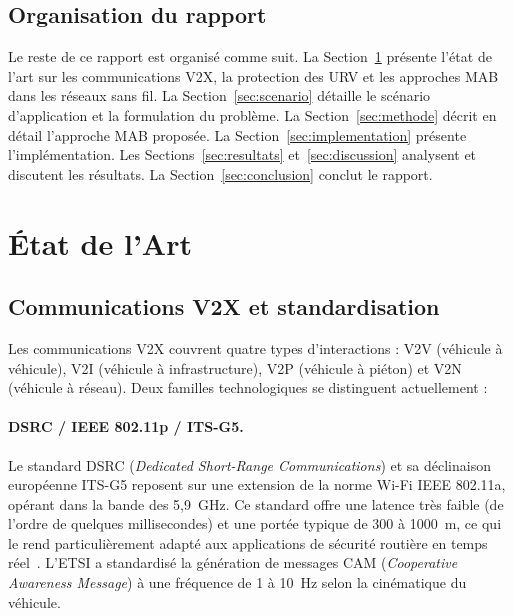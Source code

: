 \documentclass[12pt,a4paper]{article}
\begin{document}
\subsection{Organisation du rapport}

Le reste de ce rapport est organisé comme suit. La Section~\ref{sec:etat_art}
présente l'état de l'art sur les communications V2X, la protection des URV et
les approches MAB dans les réseaux sans fil. La Section~\ref{sec:scenario}
détaille le scénario d'application et la formulation du problème. La
Section~\ref{sec:methode} décrit en détail l'approche MAB proposée. La
Section~\ref{sec:implementation} présente l'implémentation. Les
Sections~\ref{sec:resultats} et~\ref{sec:discussion} analysent et discutent
les résultats. La Section~\ref{sec:conclusion} conclut le rapport.

\section{État de l'Art}
\label{sec:etat_art}

\subsection{Communications V2X et standardisation}

Les communications V2X couvrent quatre types d'interactions : V2V (véhicule à
véhicule), V2I (véhicule à infrastructure), V2P (véhicule à piéton) et V2N
(véhicule à réseau). Deux familles technologiques se distinguent actuellement :

\paragraph{DSRC / IEEE 802.11p / ITS-G5.}
Le standard DSRC (\textit{Dedicated Short-Range Communications}) et sa
déclinaison européenne ITS-G5 reposent sur une extension de la norme Wi-Fi
IEEE 802.11a, opérant dans la bande des 5,9~GHz. Ce standard offre une latence
très faible (de l'ordre de quelques millisecondes) et une portée typique de
300 à 1000~m, ce qui le rend particulièrement adapté aux applications de sécurité
routière en temps réel~\cite{etsi_cam}. L'ETSI a standardisé la génération de
messages CAM (\textit{Cooperative Awareness Message}) à une fréquence de 1 à
10~Hz selon la cinématique du véhicule.
\end{document}
